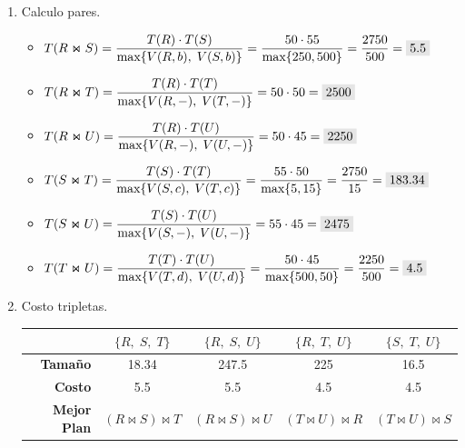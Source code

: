 \documentclass{templateNote}
\newcommand{\newparagraph}{\par\vspace{\baselineskip}\noindent}
\begin{document}
\begin{enumerate}
\begin{enumerate}[label=\arabic*)]
        \item Calculo pares.
        \begin{itemize}
            \item $T(R \Join S) =  \displaystyle\frac{T(R) \cdot T(S)}{\text{max}\{V(R,b), \; V(S,b)\}} = \frac{50 \cdot 55}{\text{max} \{250, 500\}} = \frac{2750}{500} = \colorbox{gray!20}{5.5}$ \newparagraph
            
            \newpage
            \item $T(R \Join T) =  \displaystyle\frac{T(R) \cdot T(T)}{\text{max}\{V(R,-), \; V(T,-)\}} = 50 \cdot 50 = \colorbox{gray!20}{2500}$ \newparagraph
            
            \item $T(R \Join U) =  \displaystyle\frac{T(R) \cdot T(U)}{\text{max}\{V(R,-), \; V(U,-)\}} = 50 \cdot 45 = \colorbox{gray!20}{2250}$ \newparagraph
            
            \item $T(S \Join T) =  \displaystyle\frac{T(S) \cdot T(T)}{\text{max}\{V(S,c), \; V(T,c)\}} = \frac{55 \cdot 50}{\text{max} \{5, 15\}} = \frac{2750}{15} = \colorbox{gray!20}{183.34}$ \newparagraph
            
            \item $T(S \Join U) =  \displaystyle\frac{T(S) \cdot T(U)}{\text{max}\{V(S,-), \; V(U,-)\}} = 55 \cdot 45 = \colorbox{gray!20}{2475}$ \newparagraph
            
            \item $T(T \Join U) =  \displaystyle\frac{T(T) \cdot T(U)}{\text{max}\{V(T,d), \; V(U,d)\}} = \frac{50 \cdot 45}{\text{max} \{500, 50\}} = \frac{2250}{500} = \colorbox{gray!20}{4.5}$ \newparagraph
        \end{itemize}

        \item Costo tripletas.
        \begin{center}
            \begin{tabular}{|r|c|c|c|c|}
                \hline
                & $\{R, \; S, \; T\}$ & $\{R, \; S, \; U\}$ & $\{R, \; T, \; U\}$ & $\{S, \; T, \; U\}$ \\
                \hline
                \textbf{Tamaño} & 18.34 & 247.5 & 225 & 16.5 \\
                \hline
                \textbf{Costo}  & 5.5 & 5.5 & 4.5 & 4.5 \\
                \hline
                \textbf{Mejor Plan} & $(R \Join S) \Join T$ & $(R \Join S) \Join U$ & $(T \Join U) \Join R$ & $(T \Join U) \Join S$ \\
                \hline
            \end{tabular}
        \end{center}
        \newparagraph


\end{enumerate}
\end{enumerate}
\end{document}

